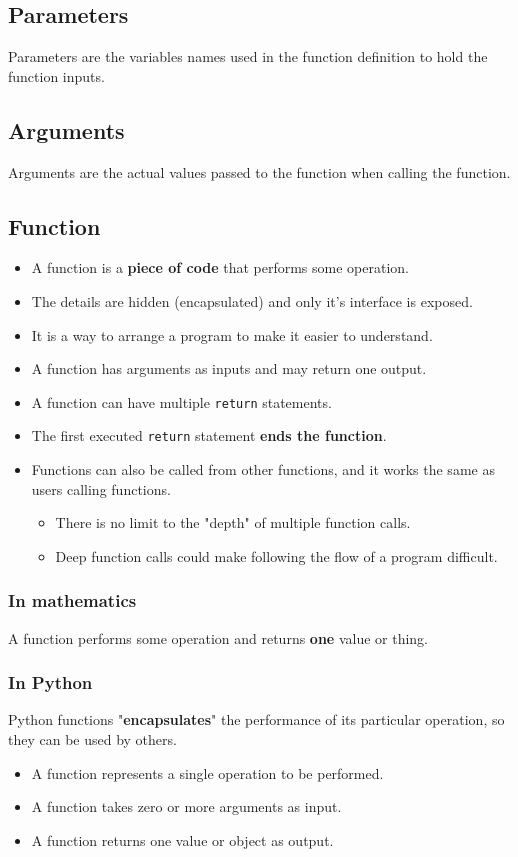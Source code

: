 \documentclass[11pt]{article}
\begin{document}
\subsection{Parameters}
\label{sec:org9646fe6}
Parameters are the variables names used in the function definition to hold the function inputs.

\subsection{Arguments}
\label{sec:orgb301406}
Arguments are the actual values passed to the function when calling the function.

\subsection{Function}
\label{sec:org5c41deb}
\begin{itemize}
\item A function is a \textbf{piece of code} that performs some operation.
\item The details are hidden (encapsulated) and only it's interface is exposed.
\item It is a way to arrange a program to make it easier to understand.
\item A function has arguments as inputs and may return one output.
\item A function can have multiple \texttt{return} statements.
\item The first executed \texttt{return} statement \textbf{ends the function}.
\item Functions can also be called from other functions, and it works the same as users calling functions.
\begin{itemize}
\item There is no limit to the "depth" of multiple function calls.
\item Deep function calls could make following the flow of a program difficult.
\end{itemize}
\end{itemize}

\subsubsection{In mathematics}
\label{sec:orgd5bd23f}
A function performs some operation and returns \textbf{one} value or thing.

\subsubsection{In Python}
\label{sec:org7e79a7d}
Python functions "\textbf{encapsulates}" the performance of its particular operation, so they can be used by others.
\begin{itemize}
\item A function represents a single operation to be performed.
\item A function takes zero or more arguments as input.
\item A function returns one value or object as output.
\end{itemize}
\end{document}
